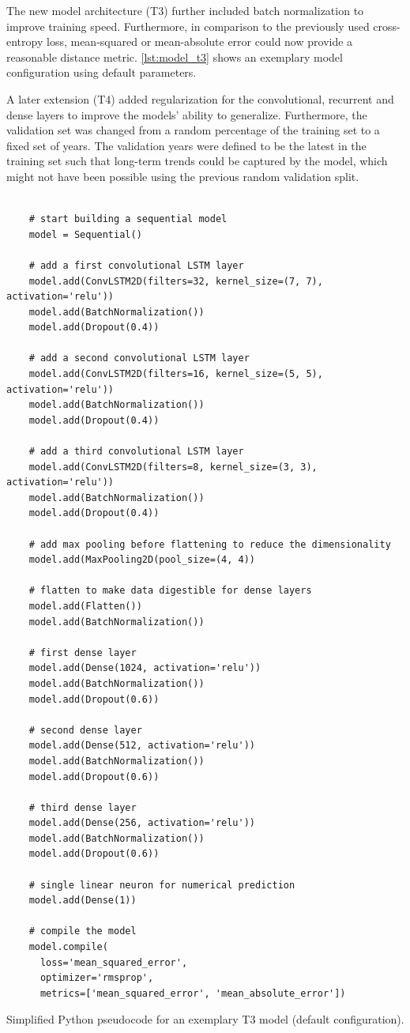 The new model architecture (T3) further included batch normalization to improve training speed. Furthermore, in comparison to the previously used cross-entropy loss, mean-squared or mean-absolute error could now provide a reasonable distance metric. \cref{lst:model_t3} shows an exemplary model configuration using default parameters.

A later extension (T4) added regularization for the convolutional, recurrent and dense layers to improve the models' ability to generalize. Furthermore, the validation set was changed from a random percentage of the training set to a fixed set of years. The validation years were defined to be the latest in the training set such that long-term trends could be captured by the model, which might not have been possible using the previous random validation split.

\begin{listing}[h!]
  \begin{verbatim}

    # start building a sequential model
    model = Sequential()

    # add a first convolutional LSTM layer
    model.add(ConvLSTM2D(filters=32, kernel_size=(7, 7), activation='relu'))
    model.add(BatchNormalization())
    model.add(Dropout(0.4))

    # add a second convolutional LSTM layer
    model.add(ConvLSTM2D(filters=16, kernel_size=(5, 5), activation='relu'))
    model.add(BatchNormalization())
    model.add(Dropout(0.4))

    # add a third convolutional LSTM layer
    model.add(ConvLSTM2D(filters=8, kernel_size=(3, 3), activation='relu'))
    model.add(BatchNormalization())
    model.add(Dropout(0.4))

    # add max pooling before flattening to reduce the dimensionality
    model.add(MaxPooling2D(pool_size=(4, 4))

    # flatten to make data digestible for dense layers
    model.add(Flatten())
    model.add(BatchNormalization())

    # first dense layer
    model.add(Dense(1024, activation='relu'))
    model.add(BatchNormalization())
    model.add(Dropout(0.6))

    # second dense layer
    model.add(Dense(512, activation='relu'))
    model.add(BatchNormalization())
    model.add(Dropout(0.6))

    # third dense layer
    model.add(Dense(256, activation='relu'))
    model.add(BatchNormalization())
    model.add(Dropout(0.6))

    # single linear neuron for numerical prediction
    model.add(Dense(1))

    # compile the model
    model.compile(
      loss='mean_squared_error',
      optimizer='rmsprop',
      metrics=['mean_squared_error', 'mean_absolute_error'])

  \end{verbatim}
  \caption{Simplified Python pseudocode for an exemplary T3 model (default configuration).}
  \label{lst:model_t3}
\end{listing}

